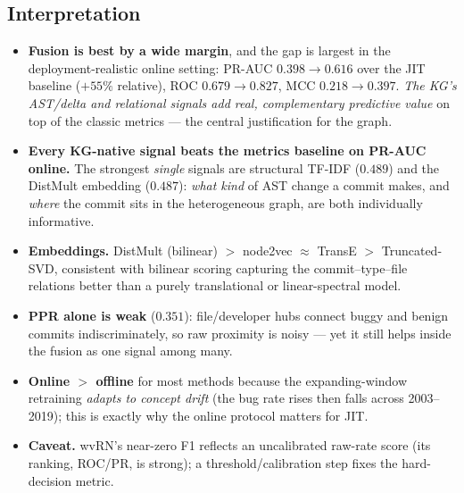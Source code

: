 \documentclass[11pt,a4paper]{article}
\begin{document}
\subsection{Interpretation}
\begin{itemize}[nosep]
  \item \textbf{Fusion is best by a wide margin}, and the gap is largest in the
        deployment-realistic online setting: PR-AUC $0.398\!\rightarrow\!0.616$
        over the JIT baseline ($+55\%$ relative), ROC $0.679\!\rightarrow\!0.827$,
        MCC $0.218\!\rightarrow\!0.397$. \emph{The KG's AST/delta and relational
        signals add real, complementary predictive value} on top of the classic
        metrics --- the central justification for the graph.
  \item \textbf{Every KG-native signal beats the metrics baseline on PR-AUC
        online.} The strongest \emph{single} signals are structural TF-IDF
        ($0.489$) and the DistMult embedding ($0.487$): \emph{what kind} of AST
        change a commit makes, and \emph{where} the commit sits in the
        heterogeneous graph, are both individually informative.
  \item \textbf{Embeddings.} DistMult (bilinear) $>$ node2vec $\approx$ TransE
        $>$ Truncated-SVD, consistent with bilinear scoring capturing the
        commit--type--file relations better than a purely translational or
        linear-spectral model.
  \item \textbf{PPR alone is weak} ($0.351$): file/developer hubs connect buggy
        and benign commits indiscriminately, so raw proximity is noisy --- yet it
        still helps inside the fusion as one signal among many.
  \item \textbf{Online $>$ offline} for most methods because the
        expanding-window retraining \emph{adapts to concept drift} (the bug rate
        rises then falls across 2003--2019); this is exactly why the online
        protocol matters for JIT.
  \item \textbf{Caveat.} wvRN's near-zero F1 reflects an uncalibrated raw-rate
        score (its ranking, ROC/PR, is strong); a threshold/calibration step
        fixes the hard-decision metric.
\end{itemize}
\end{document}
